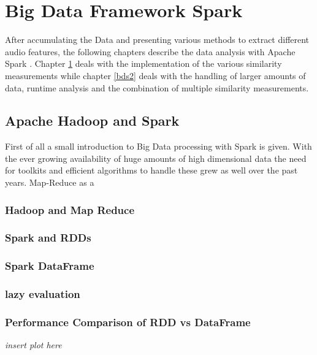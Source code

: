 
\chapter{Big Data Framework Spark}\label{bds1}

After accumulating the Data and presenting various methods to extract different audio features, the following chapters describe the data analysis with Apache Spark \cite{spark}. Chapter \ref{bds1} deals with the implementation of the various similarity measurements while chapter \ref{bds2} deals with the handling of larger amounts of data, runtime analysis and the combination of multiple similarity measurements. 

\section{Apache Hadoop and Spark} 

First of all a small introduction to Big Data processing with Spark is given.
With the ever growing availability of huge amounts of high dimensional data the need for toolkits and efficient algorithms to handle these grew as well over the past years. Map-Reduce as a 

\subsection{Hadoop and Map Reduce}

\subsection{Spark and RDDs}

\subsection{Spark DataFrame}

\subsection{lazy evaluation}

\subsection{Performance Comparison of RDD vs DataFrame}

\textit{insert plot here}

